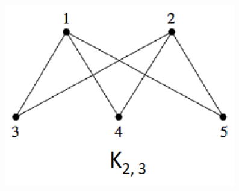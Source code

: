 \documentclass[12pt, letterpaper]{article}
\begin{document}
\begin{minipage}[t]{0.25\linewidth}
    \centering
    \strut\vspace*{-\baselineskip}\newline\includegraphics[width=\linewidth]{graphbiex2.png}
\end{minipage}
\end{document}
